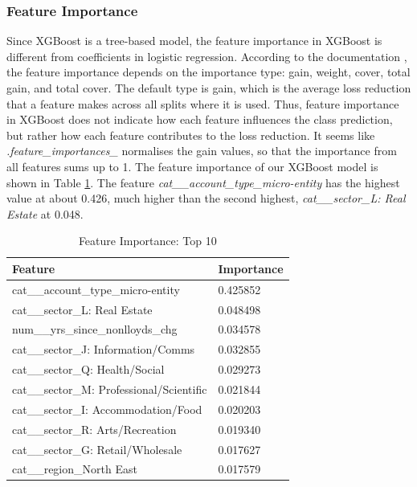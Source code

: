 \documentclass[ %
                    author={Natchalin Iwsakul \\[0.4em] Inkaphol Siriwongwattana \\[0.4em] Tanaphan Kummaraphat \\[0.6em] Patorn Srisupap},,
                supervisor={Fernando Moreno-Pino},
                    degree={MSc},
                     title={Propensity Modelling for SME Commercial Lending Using Open Public Data
},
                  subtitle={Companies House and GDELT as predictors of first-time borrowing},
                      type={},
                      year={2026}]{dissertation}
\begin{document}
\subsubsection{Feature Importance}
Since XGBoost is a tree-based model, the feature importance in XGBoost is different from coefficients in logistic regression. According to the documentation \cite{noauthor_xgboost_nodate}, the feature importance depends on the importance type: gain, weight, cover, total gain, and total cover. The default type is gain, which is the average loss reduction that a feature makes across all splits where it is used. Thus, feature importance in XGBoost does not indicate how each feature influences the class prediction, but rather how each feature contributes to the loss reduction. It seems like \textit{.feature\_importances\_} normalises the gain values, so that the importance from all features sums up to 1. The feature importance of our XGBoost model is shown in Table \ref{tab:featureimportance}. The feature \textit{cat\_\_account\_type\_micro-entity} has the highest value at about 0.426, much higher than the second highest, \textit{cat\_\_sector\_L: Real Estate} at 0.048.

\begin{table}[h]
    \centering
    \begin{tabular}{ll}
    \toprule
        Feature & Importance \\
        \midrule
        cat\_\_account\_type\_micro-entity & 0.425852 \\
        cat\_\_sector\_L: Real Estate & 0.048498 \\
        num\_\_yrs\_since\_nonlloyds\_chg & 0.034578 \\
        cat\_\_sector\_J: Information/Comms & 0.032855 \\
        cat\_\_sector\_Q: Health/Social & 0.029273 \\
        cat\_\_sector\_M: Professional/Scientific	 & 0.021844 \\
        cat\_\_sector\_I: Accommodation/Food & 0.020203 \\
        cat\_\_sector\_R: Arts/Recreation & 0.019340 \\
        cat\_\_sector\_G: Retail/Wholesale & 0.017627 \\
        cat\_\_region\_North East & 0.017579 \\
        \bottomrule
    \end{tabular}
    \caption{Feature Importance: Top 10}
    \label{tab:featureimportance}
\end{table}
\end{document}
